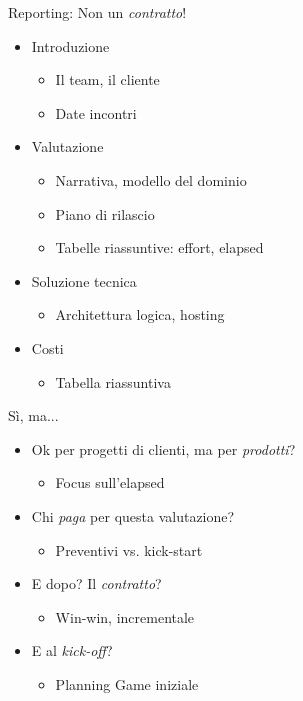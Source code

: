 \documentclass[compress, red, 14pt, pdf]{beamer}
\newcommand{\highlight}[1]{{\color{purple} \emph{#1}}}
\begin{document}
	\begin{frame}{Reporting: Non un \emph{contratto}!}
		\begin{itemize}
			\item Introduzione
			\begin{itemize}
				\item Il team, il cliente
				\item Date incontri
			\end{itemize}

			\item Valutazione
			\begin{itemize}
				\item Narrativa, modello del dominio
				\item Piano di rilascio
				\item Tabelle riassuntive: effort, elapsed
			\end{itemize}

			\item Soluzione tecnica
			\begin{itemize}
				\item Architettura logica, hosting
			\end{itemize}

			\item Costi
			\begin{itemize}
				\item Tabella riassuntiva
			\end{itemize}
		\end{itemize}
	\end{frame}
	
	\begin{frame}{Sì, ma...}
		\begin{itemize}
			\item Ok per progetti di clienti, ma per \highlight{prodotti}?
				\begin{itemize}
					\item Focus sull'elapsed
				\end{itemize}
			\item Chi \highlight{paga} per questa valutazione?
				\begin{itemize}
					\item Preventivi vs. kick-start
				\end{itemize}
			\item E dopo? Il \highlight{contratto}?
				\begin{itemize}
					\item Win-win, incrementale
				\end{itemize}
			\item E al \highlight{kick-off}?
				\begin{itemize}
					\item Planning Game iniziale
				\end{itemize}
		\end{itemize}
	\end{frame}
\end{document}
